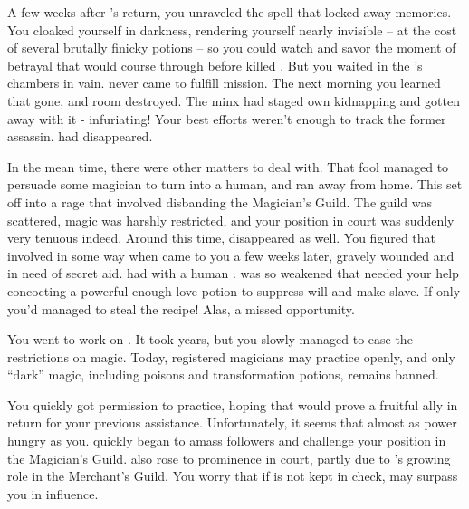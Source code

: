 \documentclass[char]{NeptuneBall}
\begin{document}
A few weeks after \cQueen{}'s return, you unraveled the spell that locked away \cQueen{\their} memories. You cloaked yourself in darkness, rendering yourself nearly invisible -- at the cost of several brutally finicky potions -- so you could watch and savor the moment of betrayal that would course through \cKing{} before \cQueen{} killed \cKing{\them}. But you waited in the \cKing{\King}'s chambers in vain. \cQueen{} never came to fulfill \cQueen{\their} mission. The next morning you learned that \cQueen{\they} \cQueen{\were} gone, and \cQueen{\their} room destroyed. The minx had staged \cQueen{\their} own kidnapping and gotten away with it - infuriating! Your best efforts weren't enough to track the former assassin. \cQueen{\They} had disappeared.

In the mean time, there were other matters to deal with. That fool \cAriel{} managed to persuade some magician to turn \cAriel{\them} into a human, and ran away from home. This set \cKing{} off into a rage that involved  \cKing{\them} disbanding the Magician's Guild. The guild was scattered, magic was harshly restricted, and your position in court was suddenly very tenuous indeed. Around this time, \cWitch{} disappeared as well. You figured that \cWitch{\they} \cWitch{\were} involved in some way when \cWitch{\they} came to you a few weeks later, gravely wounded and in need of secret aid. \cWitch{\They} had with \cWitch{\them} a human \cSlave{\prince}. \cWitch{} was so weakened that \cWitch{\they} needed your help concocting a powerful enough love potion to suppress \cSlave{\their} will and make \cSlave{\them} \cWitch{\their} slave. If only you'd managed to steal the recipe! Alas, a missed opportunity.

You went to work on \cKing{}. It took years, but you slowly managed to ease the restrictions on magic. Today, registered magicians may practice openly, and only ``dark'' magic, including poisons and transformation potions, remains banned. 

You quickly got \cWitch{} permission to practice, hoping that \cWitch{\they} would prove a fruitful ally in return for your previous assistance. Unfortunately, it seems that \cWitch{\they} \cWitch{\are} almost as power hungry as you. \cWitch{\They} quickly began to amass followers and challenge your position in the Magician's Guild. \cWitch{} also rose to prominence in court, partly due to \cWitch{\their} \cSlave{\sibling}'s growing role in the Merchant's Guild. You worry that if \cWitch{} is not kept in check, \cWitch{\they} may surpass you in influence.
\end{document}
